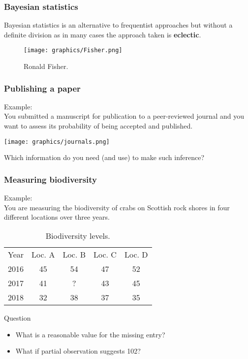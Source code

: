 \documentclass{beamer}
\newcommand{\1}{\ensuremath{\mathbf{1}}}
\begin{document}
\begin{frame}\frametitle{Bayesian statistics}
	Bayesian statistics is an alternative to frequentist approaches but without a definite division as in many cases the approach taken is \textbf{eclectic}.
	\begin{figure}
	\begin{center}
		\texttt{[image: graphics/Fisher.png]}
	\end{center}
	\caption{Ronald Fisher.}
	\end{figure}
\end{frame}
%
%
%
\begin{frame}\frametitle{Publishing a paper}
	Example:\\
	You submitted a manuscript for publication to a peer-reviewed journal and you want to assess its probability of being accepted and published.
	\begin{center}
		\texttt{[image: graphics/journals.png]}
	\end{center}
	Which information do you need (and use) to make such inference?
\end{frame}
%
%
%
\begin{frame}\frametitle{Measuring biodiversity}
	Example:\\
	You are measuring the biodiversity of crabs on Scottish rock shores in four different locations over three years.
	\begin{table}
		\caption{Biodiversity levels.}
		\begin{tabular}{c|cccc}
			Year	& Loc. A	& Loc. B	& Loc. C	& Loc. D \\
			2016	& 45		& 54		& 47		& 52 \\
			2017	& 41		& ?			& 43		& 45 \\
			2018	& 32		& 38		& 37		& 35 \\
		\end{tabular}
	\end{table}
	\begin{block}{Question}
		\begin{itemize}
			\item What is a reasonable value for the missing entry?
			\item What if partial observation suggests 102?
		\end{itemize}
	\end{block}
\end{frame}
\end{document}
